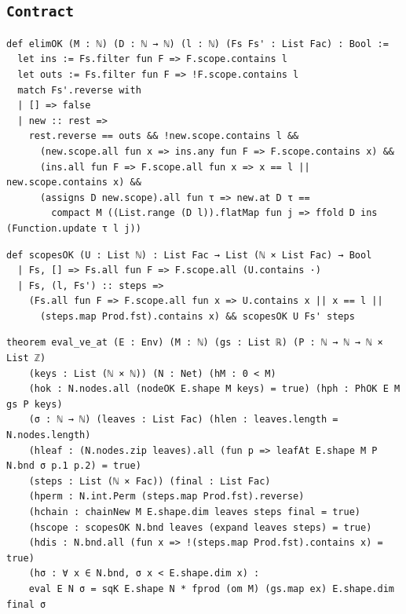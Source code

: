\subsection{\texttt{Contract}}
\begin{lstlisting}[style=leancore]
def elimOK (M : ℕ) (D : ℕ → ℕ) (l : ℕ) (Fs Fs' : List Fac) : Bool :=
  let ins := Fs.filter fun F => F.scope.contains l
  let outs := Fs.filter fun F => !F.scope.contains l
  match Fs'.reverse with
  | [] => false
  | new :: rest =>
    rest.reverse == outs && !new.scope.contains l &&
      (new.scope.all fun x => ins.any fun F => F.scope.contains x) &&
      (ins.all fun F => F.scope.all fun x => x == l || new.scope.contains x) &&
      (assigns D new.scope).all fun τ => new.at D τ ==
        compact M ((List.range (D l)).flatMap fun j => ffold D ins (Function.update τ l j))
\end{lstlisting}
\begin{lstlisting}[style=leancore]
def scopesOK (U : List ℕ) : List Fac → List (ℕ × List Fac) → Bool
  | Fs, [] => Fs.all fun F => F.scope.all (U.contains ·)
  | Fs, (l, Fs') :: steps =>
    (Fs.all fun F => F.scope.all fun x => U.contains x || x == l ||
      (steps.map Prod.fst).contains x) && scopesOK U Fs' steps
\end{lstlisting}
\begin{lstlisting}[style=leancore]
theorem eval_ve_at (E : Env) (M : ℕ) (gs : List ℝ) (P : ℕ → ℕ → ℕ × List ℤ)
    (keys : List (ℕ × ℕ)) (N : Net) (hM : 0 < M)
    (hok : N.nodes.all (nodeOK E.shape M keys) = true) (hph : PhOK E M gs P keys)
    (σ : ℕ → ℕ) (leaves : List Fac) (hlen : leaves.length = N.nodes.length)
    (hleaf : (N.nodes.zip leaves).all (fun p => leafAt E.shape M P N.bnd σ p.1 p.2) = true)
    (steps : List (ℕ × Fac)) (final : List Fac)
    (hperm : N.int.Perm (steps.map Prod.fst).reverse)
    (hchain : chainNew M E.shape.dim leaves steps final = true)
    (hscope : scopesOK N.bnd leaves (expand leaves steps) = true)
    (hdis : N.bnd.all (fun x => !(steps.map Prod.fst).contains x) = true)
    (hσ : ∀ x ∈ N.bnd, σ x < E.shape.dim x) :
    eval E N σ = sqK E.shape N * fprod (om M) (gs.map ex) E.shape.dim final σ
\end{lstlisting}

